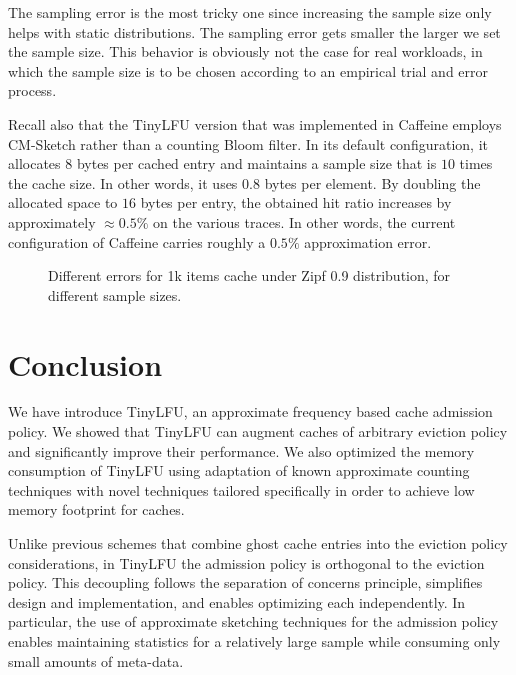 \documentclass[10pt,a4paper]{article}
\begin{document}
The sampling error is the most tricky one since increasing the sample size only helps with static distributions.
The sampling error gets smaller the larger we set the sample size.
This behavior is obviously not the case for real workloads, in which the sample size is to be chosen according to an empirical trial and error process.

Recall also that the TinyLFU version that was implemented in Caffeine employs CM-Sketch rather than a counting Bloom filter.
In its default configuration, it allocates $8$ bytes per cached entry and maintains a sample size that is $10$ times the cache size.
In other words, it uses $0.8$ bytes per element.
By doubling the allocated space to $16$ bytes per entry, the obtained hit ratio increases by approximately $\approx 0.5\%$ on the various traces.
In other words, the current configuration of Caffeine carries roughly a $0.5\%$ approximation error.





\begin{figure}[t]
\caption{Different errors for 1k items cache under Zipf 0.9 distribution, for different sample sizes. }
\label{fig:summery}
\end{figure}












\section{Conclusion}
\label{sec:discussion}
We have introduce TinyLFU, an approximate frequency based cache admission policy.
We showed that TinyLFU can augment caches of arbitrary eviction policy and significantly improve their performance.
We also optimized the memory consumption of TinyLFU using adaptation of known approximate counting techniques with novel techniques tailored specifically
in order to achieve low memory footprint for caches.

Unlike previous schemes that combine ghost cache entries into the eviction policy considerations, in TinyLFU the admission policy is orthogonal to the eviction policy.
This decoupling follows the separation of concerns principle, simplifies design and implementation, and enables optimizing each independently.
In particular, the use of approximate sketching techniques for the admission policy enables maintaining statistics for a relatively large sample while consuming only small amounts of meta-data.
\end{document}
